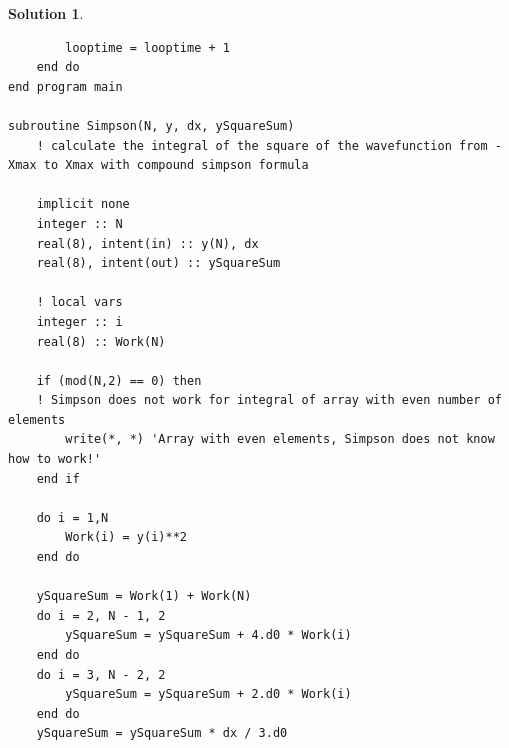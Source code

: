 \documentclass[UTF8,10pt,a4paper]{article}
\theoremstyle{Problem}
\theoremstyle{Solution}
\newtheorem*{sol}{Solution}
\begin{document}
\begin{sol}
\begin{enumerate}
\begin{lstlisting}
        looptime = looptime + 1
    end do
end program main

subroutine Simpson(N, y, dx, ySquareSum)
    ! calculate the integral of the square of the wavefunction from -Xmax to Xmax with compound simpson formula

    implicit none
    integer :: N
    real(8), intent(in) :: y(N), dx
    real(8), intent(out) :: ySquareSum

    ! local vars
    integer :: i
    real(8) :: Work(N)

    if (mod(N,2) == 0) then
    ! Simpson does not work for integral of array with even number of elements
        write(*, *) 'Array with even elements, Simpson does not know how to work!'
    end if

    do i = 1,N
        Work(i) = y(i)**2
    end do

    ySquareSum = Work(1) + Work(N)
    do i = 2, N - 1, 2
        ySquareSum = ySquareSum + 4.d0 * Work(i)
    end do
    do i = 3, N - 2, 2
        ySquareSum = ySquareSum + 2.d0 * Work(i)
    end do
    ySquareSum = ySquareSum * dx / 3.d0


\end{lstlisting}
\end{enumerate}
\end{sol}
\end{document}
